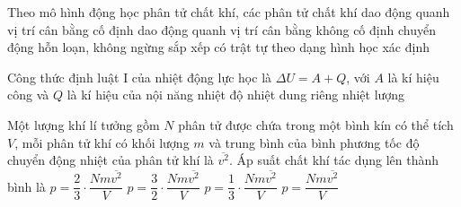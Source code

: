 	\begin{ex}%
		Theo mô hình động học phân tử chất khí, các phân tử chất khí
		\choice
		{dao động quanh vị trí cân bằng cố định}
		{dao động quanh vị trí cân bằng không cố định}
		{\True chuyển động hỗn loạn, không ngừng}
		{sắp xếp có trật tự theo dạng hình học xác định}
	\end{ex}

	\begin{ex}%
		Công thức định luật I của nhiệt động lực học là $\Delta U=A+Q$, với $A$ là kí hiệu công và $Q$ là kí hiệu của
		\choice
		{nội năng}
		{nhiệt độ}
		{nhiệt dung riêng}
		{\True nhiệt lượng}
	\end{ex}

	\begin{ex}%
		Một lượng khí lí tưởng gồm $N$ phân tử được chứa trong một bình kín có thể tích $V$, mỗi phân tử khí có khối lượng $m$ và trung bình của bình phương tốc độ chuyển động nhiệt của phân tử khí là $\overline{v^2}$. Áp suất chất khí tác dụng lên thành bình là
		\choice
		{$p=\dfrac{2}{3}\cdot\dfrac{Nm\overline{v^2}}{V}$}
		{$p=\dfrac{3}{2}\cdot\dfrac{Nm\overline{v^2}}{V}$}
		{\True $p=\dfrac{1}{3}\cdot\dfrac{Nm\overline{v^2}}{V}$}
		{$p=\dfrac{Nm\overline{v^2}}{V}$}
	\end{ex}

